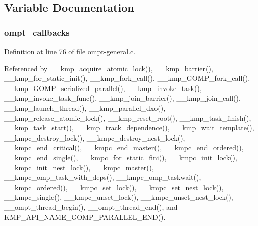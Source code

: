 \subsection{Variable Documentation}
\hypertarget{ompt-general_8c_a84a29d89cef82c7c38e1ee1f70ec994f}{
\subsubsection[{ompt\-\_\-callbacks}]{ ompt\-\_\-callbacks}}\label{ompt-general_8c_a84a29d89cef82c7c38e1ee1f70ec994f}


Definition at line 76 of file ompt-\/general.\-c.



Referenced by \-\_\-\-\_\-kmp\-\_\-acquire\-\_\-atomic\-\_\-lock(), \-\_\-\-\_\-kmp\-\_\-barrier(), \-\_\-\-\_\-kmp\-\_\-for\-\_\-static\-\_\-init(), \-\_\-\-\_\-kmp\-\_\-fork\-\_\-call(), \-\_\-\-\_\-kmp\-\_\-\-G\-O\-M\-P\-\_\-fork\-\_\-call(), \-\_\-\-\_\-kmp\-\_\-\-G\-O\-M\-P\-\_\-serialized\-\_\-parallel(), \-\_\-\-\_\-kmp\-\_\-invoke\-\_\-task(), \-\_\-\-\_\-kmp\-\_\-invoke\-\_\-task\-\_\-func(), \-\_\-\-\_\-kmp\-\_\-join\-\_\-barrier(), \-\_\-\-\_\-kmp\-\_\-join\-\_\-call(), \-\_\-\-\_\-kmp\-\_\-launch\-\_\-thread(), \-\_\-\-\_\-kmp\-\_\-parallel\-\_\-dxo(), \-\_\-\-\_\-kmp\-\_\-release\-\_\-atomic\-\_\-lock(), \-\_\-\-\_\-kmp\-\_\-reset\-\_\-root(), \-\_\-\-\_\-kmp\-\_\-task\-\_\-finish(), \-\_\-\-\_\-kmp\-\_\-task\-\_\-start(), \-\_\-\-\_\-kmp\-\_\-track\-\_\-dependence(), \-\_\-\-\_\-kmp\-\_\-wait\-\_\-template(), \-\_\-\-\_\-kmpc\-\_\-destroy\-\_\-lock(), \-\_\-\-\_\-kmpc\-\_\-destroy\-\_\-nest\-\_\-lock(), \-\_\-\-\_\-kmpc\-\_\-end\-\_\-critical(), \-\_\-\-\_\-kmpc\-\_\-end\-\_\-master(), \-\_\-\-\_\-kmpc\-\_\-end\-\_\-ordered(), \-\_\-\-\_\-kmpc\-\_\-end\-\_\-single(), \-\_\-\-\_\-kmpc\-\_\-for\-\_\-static\-\_\-fini(), \-\_\-\-\_\-kmpc\-\_\-init\-\_\-lock(), \-\_\-\-\_\-kmpc\-\_\-init\-\_\-nest\-\_\-lock(), \-\_\-\-\_\-kmpc\-\_\-master(), \-\_\-\-\_\-kmpc\-\_\-omp\-\_\-task\-\_\-with\-\_\-deps(), \-\_\-\-\_\-kmpc\-\_\-omp\-\_\-taskwait(), \-\_\-\-\_\-kmpc\-\_\-ordered(), \-\_\-\-\_\-kmpc\-\_\-set\-\_\-lock(), \-\_\-\-\_\-kmpc\-\_\-set\-\_\-nest\-\_\-lock(), \-\_\-\-\_\-kmpc\-\_\-single(), \-\_\-\-\_\-kmpc\-\_\-unset\-\_\-lock(), \-\_\-\-\_\-kmpc\-\_\-unset\-\_\-nest\-\_\-lock(), \-\_\-\-\_\-ompt\-\_\-thread\-\_\-begin(), \-\_\-\-\_\-ompt\-\_\-thread\-\_\-end(), and K\-M\-P\-\_\-\-A\-P\-I\-\_\-\-N\-A\-M\-E\-\_\-\-G\-O\-M\-P\-\_\-\-P\-A\-R\-A\-L\-L\-E\-L\-\_\-\-E\-N\-D().

